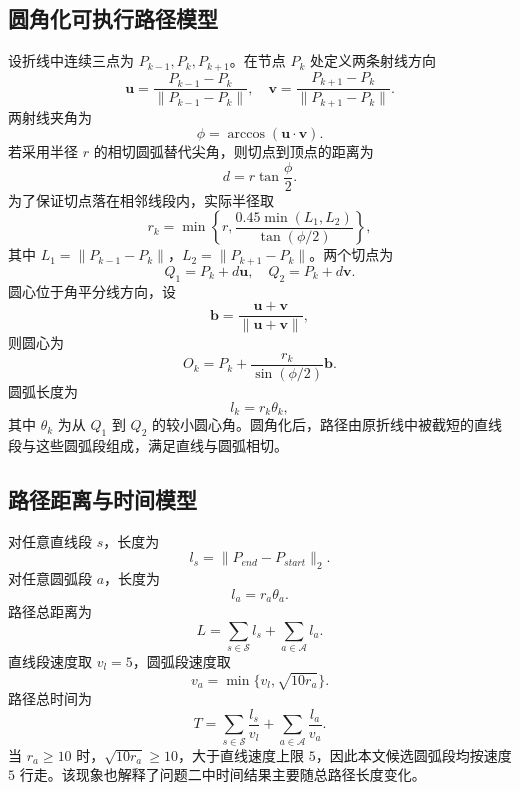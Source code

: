 \documentclass[UTF8,a4paper,12pt]{ctexart}
\begin{document}
\subsection{圆角化可执行路径模型}
设折线中连续三点为 $P_{k-1},P_k,P_{k+1}$。在节点 $P_k$ 处定义两条射线方向
\begin{equation}
\bm{u}=\frac{P_{k-1}-P_k}{\|P_{k-1}-P_k\|},\quad
\bm{v}=\frac{P_{k+1}-P_k}{\|P_{k+1}-P_k\|}.
\end{equation}
两射线夹角为
\begin{equation}
\phi=\arccos(\bm{u}\cdot\bm{v}).
\end{equation}
若采用半径 $r$ 的相切圆弧替代尖角，则切点到顶点的距离为
\begin{equation}
 d=r\tan\frac{\phi}{2}.
\end{equation}
为了保证切点落在相邻线段内，实际半径取
\begin{equation}
 r_k=\min\left\{r,\frac{0.45\min(L_1,L_2)}{\tan(\phi/2)}\right\},
\end{equation}
其中 $L_1=\|P_{k-1}-P_k\|$，$L_2=\|P_{k+1}-P_k\|$。两个切点为
\begin{equation}
 Q_1=P_k+d\bm{u},\quad Q_2=P_k+d\bm{v}.
\end{equation}
圆心位于角平分线方向，设
\begin{equation}
\bm{b}=\frac{\bm{u}+\bm{v}}{\|\bm{u}+\bm{v}\|},
\end{equation}
则圆心为
\begin{equation}
 O_k=P_k+\frac{r_k}{\sin(\phi/2)}\bm{b}.
\end{equation}
圆弧长度为
\begin{equation}
 l_k=r_k\theta_k,
\end{equation}
其中 $\theta_k$ 为从 $Q_1$ 到 $Q_2$ 的较小圆心角。圆角化后，路径由原折线中被截短的直线段与这些圆弧段组成，满足直线与圆弧相切。

\subsection{路径距离与时间模型}
对任意直线段 $s$，长度为
\begin{equation}
 l_s=\|P_{end}-P_{start}\|_2.
\end{equation}
对任意圆弧段 $a$，长度为
\begin{equation}
 l_a=r_a\theta_a.
\end{equation}
路径总距离为
\begin{equation}
L=\sum_{s\in\mathcal{S}}l_s+\sum_{a\in\mathcal{A}}l_a.
\end{equation}
直线段速度取 $v_l=5$，圆弧段速度取
\begin{equation}
 v_a=\min\{v_l,\sqrt{10r_a}\}.
\end{equation}
路径总时间为
\begin{equation}
T=\sum_{s\in\mathcal{S}}\frac{l_s}{v_l}+\sum_{a\in\mathcal{A}}\frac{l_a}{v_a}.
\end{equation}
当 $r_a\ge10$ 时，$\sqrt{10r_a}\ge10$，大于直线速度上限 $5$，因此本文候选圆弧段均按速度 $5$ 行走。该现象也解释了问题二中时间结果主要随总路径长度变化。
\end{document}

